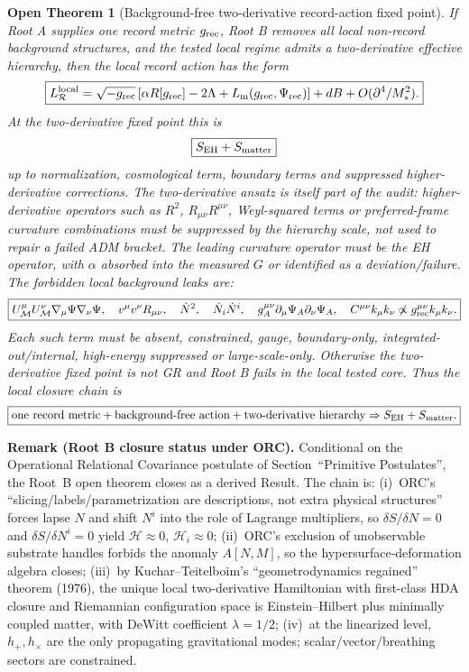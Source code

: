 \documentclass[11pt]{article}
\newtheorem{openthm}{Open Theorem}
\begin{document}
\begin{openthm}[Background-free two-derivative record-action fixed point]
If Root A supplies one record metric \(g_{\rm rec}\), Root B removes all
local non-record background structures, and the tested local regime admits a
two-derivative effective hierarchy, then the local record action has the form
\[
\boxed{
L_{\mathcal R}^{\rm local}
=
\sqrt{-g_{\rm rec}}
\left[
\alpha R[g_{\rm rec}]
-2\Lambda
+L_{\rm m}(g_{\rm rec},\Psi_{\rm rec})
\right]
+dB
+O(\partial^4/M_*^2).
}
\]
At the two-derivative fixed point this is
\[
\boxed{
S_{\rm EH}+S_{\rm matter}
}
\]
up to normalization, cosmological term, boundary terms and suppressed
higher-derivative corrections.  The two-derivative ansatz is itself part of
the audit: higher-derivative operators such as \(R^2\),
\(R_{\mu\nu}R^{\mu\nu}\), Weyl-squared terms or preferred-frame curvature
combinations must be suppressed by the hierarchy scale, not used to repair a
failed ADM bracket.  The leading curvature operator must be the EH operator,
with \(\alpha\) absorbed into the measured \(G\) or identified as a
deviation/failure.  The forbidden local background leaks are:
\[
\boxed{
U^\mu_{\mathcal M}U^\nu_{\mathcal M}\nabla_\mu\Psi\nabla_\nu\Psi,\quad
v^\mu v^\nu R_{\mu\nu},\quad
\dot N^2,\quad
\dot N_i\dot N^i,\quad
g_A^{\mu\nu}\partial_\mu\Psi_A\partial_\nu\Psi_A,
\quad
C^{\mu\nu}k_\mu k_\nu\not\propto g_{\rm rec}^{\mu\nu}k_\mu k_\nu.
}
\]
Each such term must be absent, constrained, gauge, boundary-only,
integrated-out/internal, high-energy suppressed or large-scale-only.  Otherwise
the two-derivative fixed point is not GR and Root B fails in the local tested
core.  Thus the local closure chain is
\[
\boxed{
\text{one record metric}
+\text{background-free action}
+\text{two-derivative hierarchy}
\Rightarrow
S_{\rm EH}+S_{\rm matter}.
}
\]
\end{openthm}

\medskip\noindent\textbf{Remark (Root B closure status under ORC).}
Conditional on the Operational Relational Covariance postulate of
Section~``Primitive Postulates'', the Root~B open theorem closes as a
derived Result.  The chain is:
(i)~ORC's ``slicing/labels/parametrization are descriptions, not extra
physical structures'' forces lapse $N$ and shift $N^i$ into the role of
Lagrange multipliers, so $\delta S/\delta N=0$ and $\delta S/\delta N^i=0$
yield $\mathcal H\approx 0$, $\mathcal H_i\approx 0$;
(ii)~ORC's exclusion of unobservable substrate handles forbids the anomaly
$A[N,M]$, so the hypersurface-deformation algebra closes;
(iii)~by Kuchar--Teitelboim's ``geometrodynamics regained'' theorem (1976),
the unique local two-derivative Hamiltonian with first-class HDA
closure and Riemannian configuration space is Einstein--Hilbert plus
minimally coupled matter, with DeWitt coefficient $\lambda=1/2$;
(iv)~at the linearized level, $h_+,h_\times$ are the only propagating
gravitational modes; scalar/vector/breathing sectors are constrained.
\end{document}
